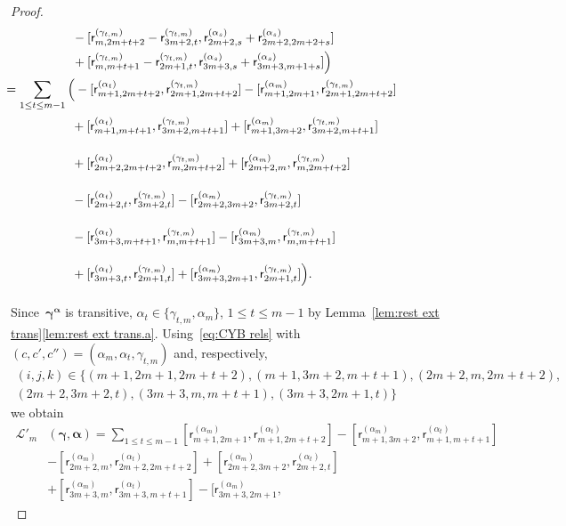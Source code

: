 \documentclass[12pt, reqno]{amsart}
\theoremstyle{definition}
\numberwithin{equation}{section}
\newcommand{\sr}[3]{\mathsf r_{#1,#2}^{(#3)}}
\begin{document}
\begin{proof}
\begin{align*}
&-[\sr m{2m+t+2}{\gamma_{t,m}}-\sr{3m+2}{t}{\gamma_{t,m}},\sr{2m+2}{s}{\alpha_{s}}+\sr{2m+2}{2m+2+s}{\alpha_{s}}]\\
&+[\sr m{m+t+1}{\gamma_{t,m}}-\sr{2m+1}{t}{\gamma_{t,m}},\sr{3m+3}{s}{\alpha_{s}}+\sr{3m+3}{m+1+s}{\alpha_{s}}]\Big)\\
&\mskip-100mu=\sum_{1\le t\le m-1} \Big(-[\sr{m+1}{2m+t+2}{\alpha_{t}},\sr{2m+1}{2m+t+2}{\gamma_{t,m}}]-
[\sr{m+1}{2m+1}{\alpha_m},\sr{2m+1}{2m+t+2}{\gamma_{t,m}}]\\
&\mskip-100mu\phantom{=\sum_{1\le t\le m-1}\Big(}+
[\sr{m+1}{m+t+1}{\alpha_{t}},\sr{3m+2}{m+t+1}{\gamma_{t,m}}]
+[\sr{m+1}{3m+2}{\alpha_{m}},\sr{3m+2}{m+t+1}{\gamma_{t,m}}]\\
&\mskip-100mu\phantom{=\sum_{1\le t\le m-1}\Big(}
+[\sr{2m+2}{2m+t+2}{\alpha_{t}},\sr m{2m+t+2}{\gamma_{t,m}}]+[\sr{2m+2}{m}{\alpha_{m}},\sr m{2m+t+2}{\gamma_{t,m}}]\\
&\mskip-100mu\phantom{=\sum_{1\le t\le m-1}\Big(}
-[\sr{2m+2}{t}{\alpha_{t}},\sr{3m+2}{t}{\gamma_{t,m}}]-[\sr{2m+2}{3m+2}{\alpha_{m}},\sr{3m+2}{t}{\gamma_{t,m}}]\\
&\mskip-100mu\phantom{=\sum_{1\le t\le m-1}\Big(}
-[\sr{3m+3}{m+t+1}{\alpha_{t}},\sr m{m+t+1}{\gamma_{t,m}}]-[\sr{3m+3}{m}{\alpha_{m}},\sr m{m+t+1}{\gamma_{t,m}}]\\
&\mskip-100mu\phantom{=\sum_{1\le t\le m-1}\Big(}
+[\sr{3m+3}{t}{\alpha_{t}},\sr{2m+1}{t}{\gamma_{t,m}}]+[\sr{3m+3}{2m+1}{\alpha_{m}},\sr{2m+1}{t}{\gamma_{t,m}}]\Big).
\end{align*}
Since~$\boldsymbol\gamma^{\boldsymbol\alpha}$ is transitive,
$\alpha_t\in\{\gamma_{t,m},\alpha_m\}$, $1\le t\le m-1$ by Lemma~\ref{lem:rest ext trans}\ref{lem:rest ext trans.a}. Using~\eqref{eq:CYB rels}
with $(c,c',c'')=(\alpha_m,\alpha_t,\gamma_{t,m})$ and, respectively,
\begin{multline*}(i,j,k)\in\{ (m+1,2m+1,2m+t+2),(m+1,3m+2,m+t+1),
(2m+2,m,2m+t+2),\\(2m+2,3m+2,t),(3m+3,m,m+t+1),(3m+3,2m+1,t)\}
\end{multline*}
we obtain
\begin{align*}
\mathscr L'_m&(\boldsymbol\gamma,\boldsymbol\alpha)=\sum_{1\le t\le m-1} [\sr{m+1}{2m+1}{\alpha_m},
\sr{m+1}{2m+t+2}{\alpha_t}]-[\sr{m+1}{3m+2}{\alpha_m},\sr{m+1}{m+t+1}{\alpha_t}]
\\&
-[\sr{2m+2}{m}{\alpha_m},\sr{2m+2}{2m+t+2}{\alpha_t}]+[\sr{2m+2}{3m+2}{\alpha_m},
\sr{2m+2}{t}{\alpha_t}]\\
&+[\sr{3m+3}{m}{\alpha_m},\sr{3m+3}{m+t+1}{\alpha_t}]-[\sr{3m+3}{2m+1}{\alpha_m},

\end{align*}
\end{proof}
\end{document}
